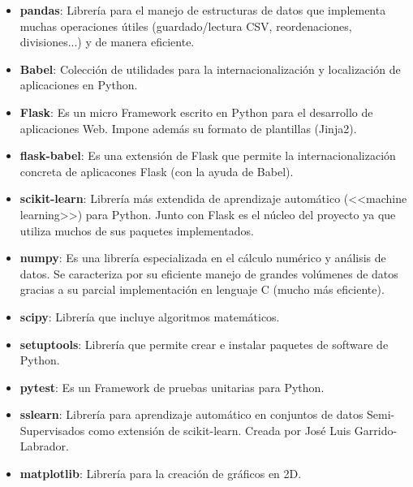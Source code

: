 \begin{itemize}
	\item \textbf{pandas}: Librería para el manejo de estructuras de datos que implementa
	muchas operaciones útiles (guardado/lectura CSV, reordenaciones,
	divisiones...) y de manera eficiente.
	\item \textbf{Babel}: Colección de utilidades para la internacionalización y
	localización de aplicaciones en Python.
	\item \textbf{Flask}: Es un micro Framework escrito en Python para el desarrollo de
	aplicaciones Web. Impone además su formato de plantillas (Jinja2).
	\item \textbf{flask-babel}: Es una extensión de Flask que permite la
	internacionalización concreta de aplicacones Flask (con la ayuda de Babel).
	\item \textbf{scikit-learn}: Librería más extendida de aprendizaje automático
	(<<machine learning>>) para Python. Junto con Flask es el núcleo del
	proyecto ya que utiliza muchos de sus paquetes implementados.
	\item \textbf{numpy}: Es una librería especializada en el cálculo numérico y análisis
	de datos. Se caracteriza por su eficiente manejo de grandes volúmenes de
	datos gracias a su parcial implementación en lenguaje C (mucho más
	eficiente).
	\item \textbf{scipy}: Librería que incluye algoritmos matemáticos.
	\item \textbf{setuptools}: Librería que permite crear e instalar paquetes de
	software de Python.
	\item \textbf{pytest}: Es un Framework de pruebas unitarias para Python.
	\item \textbf{sslearn}: Librería para aprendizaje automático en conjuntos de datos
	Semi-Supervisados como extensión de scikit-learn. Creada por José Luis Garrido-Labrador.
	\item \textbf{matplotlib}: Librería para la creación de gráficos en 2D.
\end{itemize}
